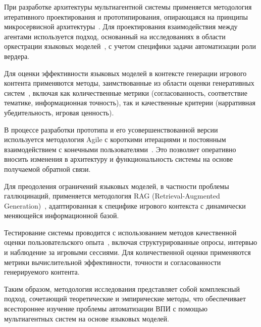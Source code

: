 При разработке архитектуры мультиагентной системы применяется методология итеративного проектирования и прототипирования, опирающаяся на принципы микросервисной архитектуры~\cite{newman2021building}. Для проектирования взаимодействия между агентами используется подход, основанный на исследованиях в области оркестрации языковых моделей~\cite{shen2023hugginggpt}, с учетом специфики задачи автоматизации роли вердера.

Для оценки эффективности языковых моделей в контексте генерации игрового контента применяются методы, заимствованные из области оценки генеративных систем~\cite{zhou2023evaluation}, включая как количественные метрики (согласованность, соответствие тематике, информационная точность), так и качественные критерии (нарративная убедительность, игровая ценность).

В процессе разработки прототипа и его усовершенствованной версии используется методология Agile с короткими итерациями и постоянным взаимодействием с конечными пользователями~\cite{martin2019clean}. Это позволяет оперативно вносить изменения в архитектуру и функциональность системы на основе получаемой обратной связи.

Для преодоления ограничений языковых моделей, в частности проблемы галлюцинаций, применяется методология RAG (Retrieval-Augmented Generation)~\cite{lewis2020retrieval}, адаптированная к специфике игрового контекста с динамически меняющейся информационной базой.

Тестирование системы проводится с использованием методов качественной оценки пользовательского опыта~\cite{albert2013measuring}, включая структурированные опросы, интервью и наблюдение за игровыми сессиями. Для количественной оценки применяются метрики вычислительной эффективности, точности и согласованности генерируемого контента.

Таким образом, методология исследования представляет собой комплексный подход, сочетающий теоретические и эмпирические методы, что обеспечивает всестороннее изучение проблемы автоматизации ВПИ с помощью мультиагентных систем на основе языковых моделей.
